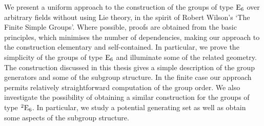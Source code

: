 


\begin{abstracts}        %

We present a uniform approach to the construction of the groups of type $\mathord{\mathrm{E}}_6$ over arbitrary fields without using Lie theory, in
the spirit of Robert Wilson's `The Finite
Simple Groups'. Where possible, proofs are obtained from the basic principles, which minimises the number of dependencies, 
making our approach to the construction elementary and self-contained. In particular, we prove the simplicity of the groups of type 
$\mathord{\mathrm{E}}_6$ and illuminate some of the related geometry. The construction discussed in this thesis gives a simple description of the 
group generators and some of the subgroup structure. In the finite case our approach  permits relatively straightforward 
computation of the group order. We also investigate the possibility of obtaining a similar construction for the groups of type ${}^2\mathord{\mathrm{E}}_6$. 
In particular, we 
study a potential generating set as well as obtain some aspects of the subgroup structure. 


\end{abstracts}




